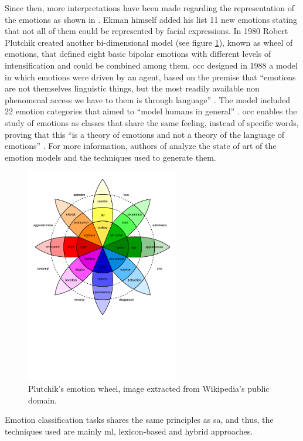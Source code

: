 Since then, more interpretations have been made regarding the representation of the emotions as shown in \cite{cambria2012hourglass}. Ekman himself added his list 11 new emotions stating that not all of them could be represented by facial expressions. In 1980 Robert Plutchik created another bi-dimensional model (see figure \ref{fig:plutchik-wheeel}), known as wheel of emotions, that defined eight basic bipolar emotions with different levels of intensification and could be combined among them. \acrfull{occ} designed in 1988 a model in which emotions were driven by an agent, based on the premise that ``emotions are not themselves linguistic things, but the most readily available non phenomenal access we have to them is through language'' \cite{binali2010computational}. The model included 22 emotion categories that aimed to ``model humans in general'' \cite{binali2010computational}. \acrshort{occ} enables the study of emotions as classes that share the same feeling, instead of specific words, proving that this ``is a theory of emotions and not a theory of the language of emotions'' \cite{binali2010computational}. For more information, authors of \cite{binali2012emotion} analyze the state of art of the emotion models and the techniques used to generate them.

\begin{figure}[!htp]
  \center
  \includegraphics[width=0.6\textwidth]{figures/plutchik-wheel}
  \caption{Plutchik's emotion wheel, image extracted from Wikipedia's public domain.}
  \label{fig:plutchik-wheeel}
\end{figure}

Emotion classification tasks shares the same principles as \acrshort{sa}, and thus, the techniques used are mainly \acrshort{ml}, lexicon-based and hybrid approaches.
